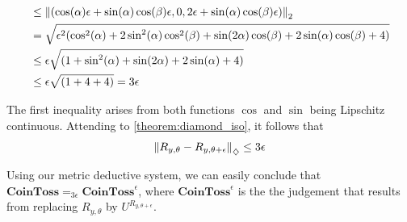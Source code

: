 \begin{example} 
\begin{align*}
  &  \leq \left\lVert ( \cos(\alpha)\epsilon + \sin(\alpha)\cos(\beta) \epsilon, 0, 2\epsilon + \sin(\alpha)\cos(\beta) \epsilon) \right\rVert_{2} \\
  & = \sqrt{\epsilon^2(\cos^2(\alpha) + 2\sin^2(\alpha)\cos^2(\beta)+\sin(2\alpha)\cos(\beta) + 2\sin(\alpha)\cos(\beta) + 4 )} \\
  &\leq \epsilon \sqrt{(1 + \sin^2(\alpha) +\sin(2\alpha) + 2\sin(\alpha) + 4 )} \\
  & \leq \epsilon \sqrt{(1 + 4 + 4 )} = 3 \epsilon
\end{align*}

The first inequality arises from both functions $\cos$ and $\sin$ being Lipschitz continuous. Attending to \autoref{theorem:diamond_iso}, it follows that
  \begin{align*}
    \left\lVert R_{y, \theta}- R_{y, \theta + \epsilon}  \right\rVert_{\diamondsuit} \leq 3 \epsilon
  \end{align*}

Using our metric deductive system, we can easily conclude that $\textbf{CoinToss} =_{3 \epsilon} \textbf{CoinToss}^{\epsilon}$, where $\textbf{CoinToss}^{\epsilon}$ is the the judgement that results from replacing $R_{y, \theta}$ by $U^{R_{y, \theta + \epsilon}}$.

\end{example}


